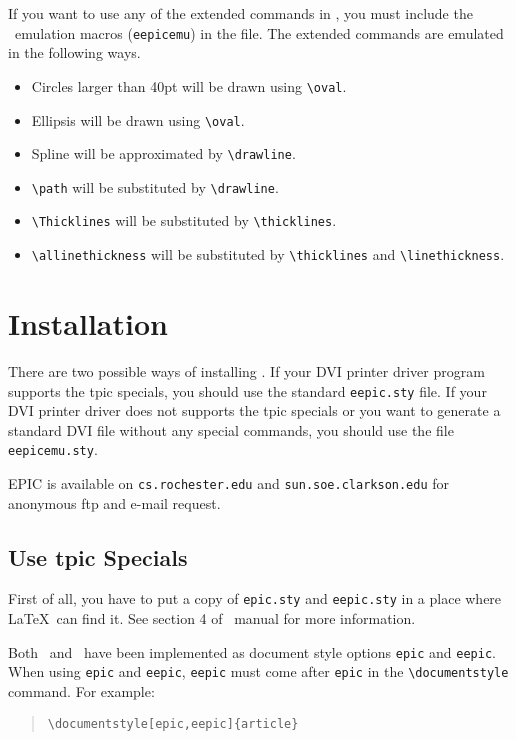 If you want to use any of the extended commands in \eepic, you
must include the \eepic\ emulation macros (\verb|eepicemu|) in
the file. The extended commands are emulated in the following
ways.
\begin{itemize}
\item Circles larger than 40pt will be drawn using \verb|\oval|.
\item Ellipsis will be drawn using \verb|\oval|.
\item Spline will be approximated by \verb|\drawline|.
\item \verb|\path| will be substituted by \verb|\drawline|.
\item \verb|\Thicklines| will be substituted by
\verb|\thicklines|.
\item \verb|\allinethickness| will be substituted by
\verb|\thicklines| and \verb|\linethickness|.
\end{itemize}

\clearpage


\section{Installation}
There are two possible ways of installing \eepic. If your DVI
printer driver program supports the tpic specials, you should use
the standard \verb|eepic.sty| file. If your DVI printer driver
does not supports the tpic specials or you want to generate a
standard DVI file without any special commands, you should use
the file \verb|eepicemu.sty|.

EPIC is available on \verb|cs.rochester.edu| and
\verb|sun.soe.clarkson.edu| for anonymous ftp and e-mail request.

\subsection{Use tpic Specials}
First of all, you have to put a copy of \verb|epic.sty| and
\verb|eepic.sty| in a place where \LaTeX\ can find it. See
section 4 of \epic\ manual for more information.

Both \epic\ and \eepic\ have been implemented as document style
options \verb|epic| and \verb|eepic|. When using
\verb|epic| and \verb|eepic|, \verb|eepic| must come
after \verb|epic| in the \verb|\documentstyle| command. For example:
\begin{quote}
\begin{verbatim}
\documentstyle[epic,eepic]{article}
\end{verbatim}
\end{quote}

